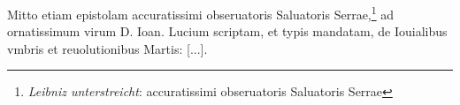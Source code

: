 \pend \pstart [p.~228] Mitto etiam epistolam accuratissimi obseruatoris Saluatoris Serrae\protect{},\footnote{\textit{Leibniz unterstreicht}: accuratissimi obseruatoris Saluatoris Serrae\protect{}} ad ornatissimum virum D. Ioan. Lucium\protect{} scriptam, et typis mandatam, de Iouialibus vmbris et reuolutionibus Martis\protect{}: [...].